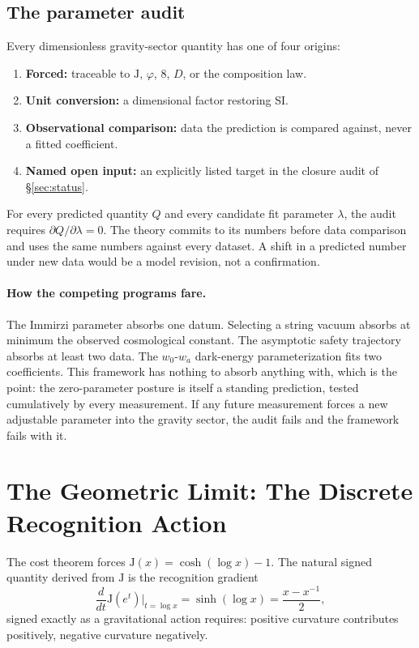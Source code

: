 \documentclass[11pt,letterpaper]{article}
\theoremstyle{definition}
\newcommand{\J}{\mathrm{J}}
\newcommand{\phiG}{\varphi}
\begin{document}
\subsection{The parameter audit}

Every dimensionless gravity-sector quantity has one of four origins:
\begin{enumerate}[nosep]
\item \textbf{Forced:} traceable to $\J$, $\phiG$, $8$, $D$, or the
composition law.
\item \textbf{Unit conversion:} a dimensional factor restoring SI.
\item \textbf{Observational comparison:} data the prediction is
compared against, never a fitted coefficient.
\item \textbf{Named open input:} an explicitly listed target in the
closure audit of \S\ref{sec:status}.
\end{enumerate}
For every predicted quantity $Q$ and every candidate fit parameter
$\lambda$, the audit requires $\partial Q/\partial\lambda=0$.  The
theory commits to its numbers before data comparison and uses the same
numbers against every dataset.  A shift in a predicted number under new
data would be a model revision, not a confirmation.

\paragraph{How the competing programs fare.}
The Immirzi parameter absorbs one datum.  Selecting a string vacuum
absorbs at minimum the observed cosmological constant.  The asymptotic
safety trajectory absorbs at least two data.  The
$w_0$-$w_a$ dark-energy parameterization fits two coefficients.  This
framework has nothing to absorb anything with, which is the point: the
zero-parameter posture is itself a standing prediction, tested
cumulatively by every measurement.  If any future measurement forces a
new adjustable parameter into the gravity sector, the audit fails and
the framework fails with it.

\section{The Geometric Limit: The Discrete Recognition Action}
\label{sec:action}

The cost theorem forces $\J(x)=\cosh(\log x)-1$.  The natural signed
quantity derived from $\J$ is the recognition gradient
\begin{equation}\label{eq:sinh}
\frac{d}{dt}\J(e^t)\Big|_{t=\log x}=\sinh(\log x)=\frac{x-x^{-1}}{2},
\end{equation}
signed exactly as a gravitational action requires: positive curvature
contributes positively, negative curvature negatively.
\end{document}
